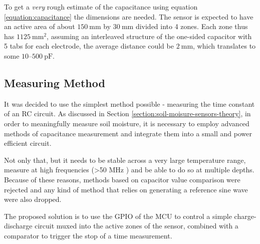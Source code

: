 To get a \emph{very} rough estimate of the capacitance using equation \ref{equation:capacitance} the dimensions are needed. The sensor is expected to have an active area of about $150~\mathrm{mm}$ by $30~\mathrm{mm}$ divided into 4 zones. Each zone thus has $1125~\mathrm{mm^2}$, assuming an interleaved structure of the one-sided capacitor with 5 tabs for each electrode, the average distance could be $2~\mathrm{mm}$, which translates to some $10\text{--}500~\mathrm{pF}$. %

\subsection{\label{section:measuring-method}Measuring Method}
It was decided to use the simplest method possible - measuring the time constant of an RC circuit. As discussed in Section \ref{section:soil-moisure-sensors-theory}, in order to meaningfully measure soil moisture, it is necessary to employ advanced methods of capacitance measurement and integrate them into a small and power efficient circuit.

Not only that, but it needs to be stable across a very large temperature range, measure at high frequencies (>50 MHz \cite{meter_group_soil_2023}) and be able to do so at multiple depths. Because of these reasons, methods based on capacitor value comparison were rejected and any kind of method that relies on generating a reference sine wave were also dropped.

The proposed solution is to use the GPIO of the MCU to control a simple charge-discharge circuit muxed into the active zones of the sensor, combined with a comparator to trigger the stop of a time measurement.

